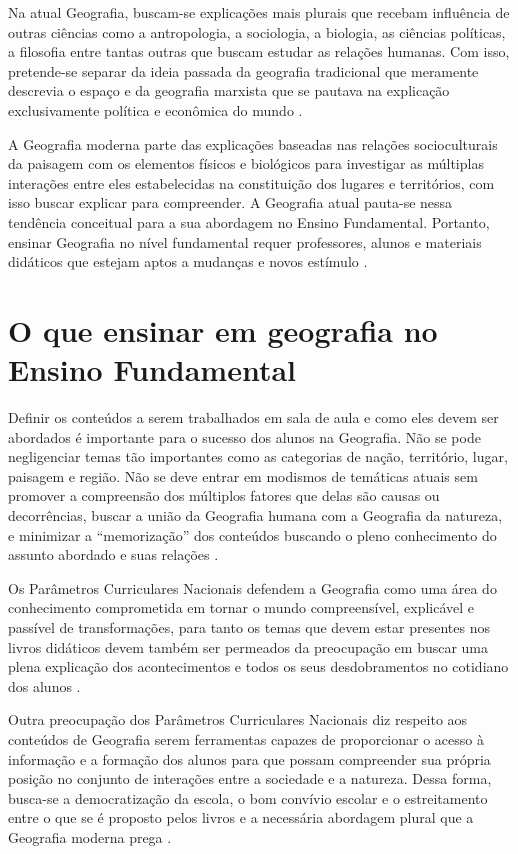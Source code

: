 \begin{refsection}
    Na atual Geografia, buscam-se explicações mais plurais que recebam influência de outras ciências como a antropologia, a sociologia, a biologia, as ciências políticas, a filosofia entre tantas outras que buscam estudar as relações humanas. Com isso, pretende-se separar da ideia passada da geografia tradicional que meramente descrevia o espaço e da geografia marxista que se pautava na explicação exclusivamente política e econômica do mundo \cite{REGOAndCastrogiovanniAndKaercher2007Geografia}.  

    A Geografia moderna parte das explicações baseadas nas relações socioculturais da paisagem com os elementos físicos e biológicos para investigar as múltiplas interações entre eles estabelecidas na constituição dos lugares e territórios, com isso buscar explicar para compreender. A Geografia atual pauta-se nessa tendência conceitual para a sua abordagem no Ensino Fundamental. Portanto, ensinar Geografia no nível fundamental requer professores, alunos e materiais didáticos que estejam aptos a mudanças e novos estímulo \cite{TEIXEIRA2013Caminhar}. 


    \section{O que ensinar em geografia no Ensino Fundamental}

    Definir os conteúdos a serem trabalhados em sala de aula e como eles devem ser abordados é importante para o sucesso dos alunos na Geografia. Não se pode negligenciar temas tão importantes como as categorias de nação, território, lugar, paisagem e região. Não se deve entrar em modismos de temáticas atuais sem promover a compreensão dos múltiplos fatores que delas são causas ou decorrências, buscar a união da Geografia humana com a Geografia da natureza, e minimizar a “memorização” dos conteúdos buscando o pleno conhecimento do assunto abordado e suas relações \cite{ParâmetrosCurricularesGeografia2001}. 

    Os Parâmetros Curriculares Nacionais defendem a Geografia como uma área do conhecimento comprometida em tornar o mundo compreensível, explicável e passível de transformações, para tanto os temas que devem estar presentes nos livros didáticos devem também ser permeados da preocupação em buscar uma plena explicação dos acontecimentos e todos os seus desdobramentos no cotidiano dos alunos \cite{ParâmetrosCurricularesGeografia2001}. 

    Outra preocupação dos Parâmetros Curriculares Nacionais diz respeito aos conteúdos de Geografia serem ferramentas capazes de proporcionar o acesso à informação e a formação dos alunos para que possam compreender sua própria posição no conjunto de interações entre a sociedade e a natureza. Dessa forma, busca-se a democratização da escola, o bom convívio escolar e o estreitamento entre o que se é proposto pelos livros e a necessária abordagem plural que a Geografia moderna prega \cite{ParâmetrosCurricularesGeografia2001}. 


\end{refsection}
